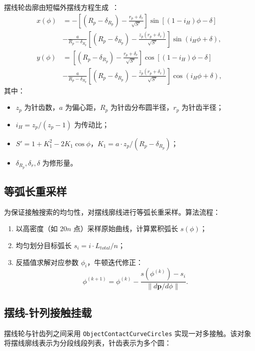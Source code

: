 \documentclass[12pt]{ctexart}
\begin{document}
摆线轮齿廓由短幅外摆线方程生成~\cite{litvin}：
\begin{align}
x(\phi) &= -\left[(R_p - \delta_{R_p}) - \frac{r_p + \delta_r}{\sqrt{S'}}\right]\sin\left[(1-i_H)\phi - \delta\right] \nonumber \\ &
- \frac{a}{R_p - \delta_{R_p}}\left[(R_p - \delta_{R_p}) - \frac{z_p(r_p + \delta_r)}{\sqrt{S'}}\right]\sin(i_H\phi + \delta), \\ y(\phi) &= \left[(R_p - \delta_{R_p}) - \frac{r_p + \delta_r}{\sqrt{S'}}\right]\cos\left[(1-i_H)\phi - \delta\right] \nonumber \\ &
- \frac{a}{R_p - \delta_{R_p}}\left[(R_p - \delta_{R_p}) - \frac{z_p(r_p + \delta_r)}{\sqrt{S'}}\right]\cos(i_H\phi + \delta),
\end{align}
其中：
\begin{itemize}
  \item $z_p$ 为针齿数，$a$ 为偏心距，$R_p$ 为针齿分布圆半径，$r_p$ 为针齿半径；
  \item $i_H = z_p/(z_p - 1)$ 为传动比；
  \item $S' = 1 + K_1^2 - 2K_1\cos\phi$，$K_1 = a \cdot z_p / (R_p - \delta_{R_p})$；
  \item $\delta_{R_p}, \delta_r, \delta$ 为修形量。
\end{itemize}

\subsection{等弧长重采样}

为保证接触搜索的均匀性，对摆线廓线进行等弧长重采样。算法流程：
\begin{enumerate}
  \item 以高密度（如 $20n$ 点）采样原始曲线，计算累积弧长 $s(\phi)$；
  \item 均匀划分目标弧长 $s_i = i \cdot L_{total} / n$；
  \item 反插值求解对应参数 $\phi_i$，牛顿迭代修正：
  \begin{equation}
  \phi^{(k+1)} = \phi^{(k)} - \frac{s(\phi^{(k)}) - s_i}{\|d\mathbf{p}/d\phi\|}.
  \end{equation}
\end{enumerate}

\subsection{摆线-针列接触挂载}

摆线轮与针齿列之间采用 \texttt{ObjectContactCurveCircles} 实现一对多接触。该对象将摆线廓线表示为分段线段列表，针齿表示为多个圆：
\end{document}

